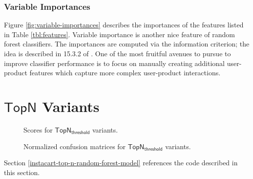 \documentclass[11pt]{article}
\theoremstyle{definition}
\numberwithin{equation}{section}
\begin{document}
\hypertarget{variable-importances}{%
  \subsubsection{Variable Importances}\label{variable-importances}}
  
Figure \ref{fig:variable-importances} describes the importances of the features listed in Table \ref{tbl:features}.
Variable importance is another nice feature of random forest classifiers.  The importances are computed via the information criterion; the idea is described in 15.3.2 of \cite{hastieElementsStatisticalLearning2009}.
One of the most
fruitful avenues to pursue to improve classifier performance is to focus
on manually creating additional user-product features which capture more
complex user-product interactions.






\hypertarget{top-n-variants}{%
  \section{\texorpdfstring{\(\mathsf{TopN}\)
      Variants}{Top-N Variants}}\label{top-n-variants}}

\begin{figure}[t]
\begin{center}
\caption{Scores for \(\mathsf{TopN_\textsf{threshold}}\) variants.}
\label{fig:n-threshold-scores}
\end{center}
\end{figure}


\begin{figure}[h]
\begin{center}
\caption{Normalized confusion matrices for \(\mathsf{TopN_\textsf{threshold}}\) variants.}
\label{fig:n-threshold-confusion}
\end{center}
\end{figure}


Section \ref{instacart-top-n-random-forest-model} references the code described in this section.
\end{document}
